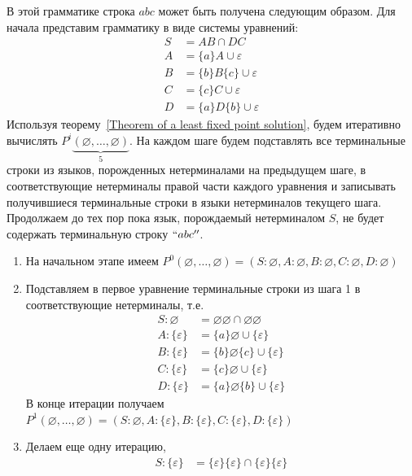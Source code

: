 \begin{example}
    В этой грамматике строка $abc$ может быть получена следующим образом. Для начала представим грамматику в виде системы уравнений:
    \begin{align*}
    S &= A B \cap D C \\ 
    A &= \{a\}A \cup \varepsilon \\ 
    B &= \{b\}B\{c\} \cup \varepsilon \\
    C &= \{c\}C \cup \varepsilon \\ 
    D &= \{a\}D\{b\} \cup \varepsilon
    \end{align*}
    Используя теорему~\ref{Theorem of a least fixed point solution}, будем итеративно вычислять $P^{i}\underbrace{(\varnothing,\ldots,\varnothing)}_5$. На каждом шаге будем подставлять все терминальные строки из языков, порожденных нетерминалами на предыдущем шаге, в соответствующие нетерминалы правой части каждого уравнения и записывать получившиеся терминальные строки в языки нетерминалов текущего шага. Продолжаем до тех пор пока язык, порождаемый нетерминалом $S$, не будет содержать терминальную строку $``abc''$.
    \begin{enumerate}
        \item На начальном этапе имеем $P^{0}(\varnothing,\ldots,\varnothing) = (S: \varnothing, A: \varnothing, B: \varnothing, C: \varnothing, D: \varnothing)$ 
        \item Подставляем в первое уравнение терминальные строки из шага 1 в соответствующие нетерминалы, т.е. 
        \begin{align*}
            S:  \varnothing &= \varnothing\varnothing \cap \varnothing\varnothing \\ 
            A: \{\varepsilon\} &= \{a\}\varnothing \cup \{\varepsilon\} \\ 
            B: \{\varepsilon\} &= \{b\}\varnothing\{c\} \cup \{\varepsilon\} \\
            C: \{\varepsilon\} &= \{c\}\varnothing \cup \{\varepsilon\} \\ 
            D: \{\varepsilon\} &= \{a\}\varnothing\{b\} \cup \{\varepsilon\}
        \end{align*}
        В конце итерации получаем $P^{1}(\varnothing,\ldots,\varnothing) = (S: \varnothing, A: \{\varepsilon\}, B: \{\varepsilon\}, C: \{\varepsilon\}, D: \{\varepsilon\})$
        \item Делаем еще одну итерацию,
        \begin{align*}
            S:  \{\varepsilon\} &= \{\varepsilon\}\{\varepsilon\} \cap \{\varepsilon\}\{\varepsilon\} \\ 

\end{align*}
\end{enumerate}
\end{example}

